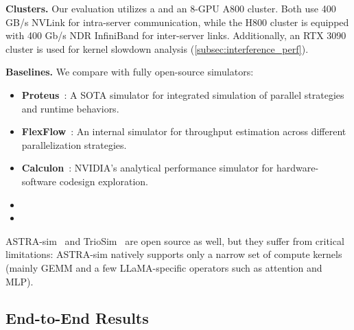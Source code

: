 \noindent\textbf{Clusters.} 
Our evaluation utilizes a  and an 8-GPU A800 cluster. Both use 400 GB/s NVLink for intra-server communication, while the H800 cluster is equipped with 400 Gb/s NDR InfiniBand for inter-server links. Additionally, an RTX 3090 cluster is used for kernel slowdown analysis (\cref{subsec:interference_perf}).

\noindent\textbf{Baselines.} 
We compare \sys with  fully open-source simulators:

\begin{itemize}[leftmargin=3mm]
    \vspace{-0.2em}
    \item \textbf{Proteus}~\cite{duan2024proteus}: A SOTA simulator for integrated simulation of parallel strategies and runtime behaviors.
    \item \textbf{FlexFlow}~\cite{jia2019beyond}: An internal simulator for throughput estimation across different parallelization strategies.
    \item \textbf{Calculon}~\cite{isaev2023calculon}: NVIDIA's analytical performance simulator for hardware-software codesign exploration.
    \item {}
    \item {}
\end{itemize}


ASTRA-sim~\cite{won2023astra} and TrioSim~\cite{li2025triosim} are open source as well, but they suffer from critical limitations: ASTRA-sim natively supports only a narrow set of compute kernels (mainly GEMM and a few LLaMA-specific operators such as attention and MLP).



\subsection{End-to-End Results} 
\label{subsec:overall_perf} 

